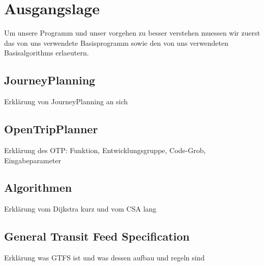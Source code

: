\section{Ausgangslage}
Um unsere Programm und unser vorgehen zu besser verstehen muessen wir zuerst das von uns verwendete Basisprogramm sowie den von uns verwendeten Basisalgorithms erlaeutern.

\subsection{JourneyPlanning}
Erklärung von JourneyPlanning an sich

\subsection{OpenTripPlanner}
Erklärung des OTP: Funktion, Entwicklungsgruppe, Code-Grob, Eingabeparameter

\subsection{Algorithmen}
Erklärung vom Dijkstra kurz und vom CSA lang

\subsection{General Transit Feed Specification}
Erklärung was GTFS ist und was dessen aufbau und regeln sind
